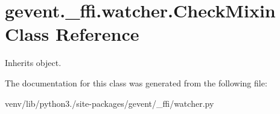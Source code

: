 \hypertarget{classgevent_1_1__ffi_1_1watcher_1_1_check_mixin}{}\section{gevent.\+\_\+ffi.\+watcher.\+Check\+Mixin Class Reference}
\label{classgevent_1_1__ffi_1_1watcher_1_1_check_mixin}


Inherits object.



The documentation for this class was generated from the following file\+:\begin{DoxyCompactItemize}
\item 
venv/lib/python3./site-\/packages/gevent/\+\_\+ffi/watcher.\+py\end{DoxyCompactItemize}
